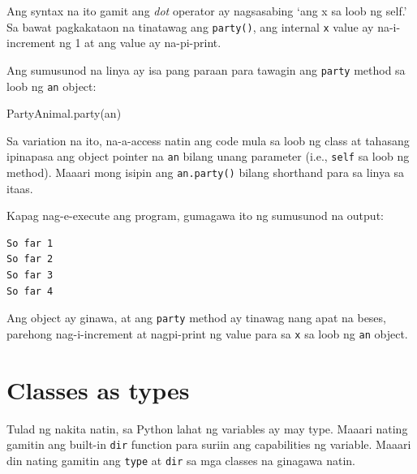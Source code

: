 \documentclass[10pt,]{book}
\newenvironment{Shaded}{}{}
\newcommand{\NormalTok}[1]{#1}
\begin{document}
Ang syntax na ito gamit ang \emph{dot} operator ay nagsasabing `ang x sa
loob ng self.' Sa bawat pagkakataon na tinatawag ang \texttt{party()},
ang internal \texttt{x} value ay na-i-increment ng 1 at ang value ay
na-pi-print.

Ang sumusunod na linya ay isa pang paraan para tawagin ang
\texttt{party} method sa loob ng \texttt{an} object:

\begin{Shaded}
\begin{Highlighting}[]
\NormalTok{PartyAnimal.party(an)}
\end{Highlighting}
\end{Shaded}

Sa variation na ito, na-a-access natin ang code mula sa loob ng class at
tahasang ipinapasa ang object pointer na \texttt{an} bilang unang
parameter (i.e., \texttt{self} sa loob ng method). Maaari mong isipin
ang \texttt{an.party()} bilang shorthand para sa linya sa itaas.

Kapag nag-e-execute ang program, gumagawa ito ng sumusunod na output:

{\small
\begin{verbatim}
So far 1
So far 2
So far 3
So far 4
\end{verbatim}
}

Ang object ay ginawa, at ang \texttt{party} method ay tinawag nang apat
na beses, parehong nag-i-increment at nagpi-print ng value para sa
\texttt{x} sa loob ng \texttt{an} object.

\section{Classes as types}\label{classes-as-types}

 

Tulad ng nakita natin, sa Python lahat ng variables ay may type. Maaari
nating gamitin ang built-in \texttt{dir} function para suriin ang
capabilities ng variable. Maaari din nating gamitin ang \texttt{type} at
\texttt{dir} sa mga classes na ginagawa natin.
\end{document}
